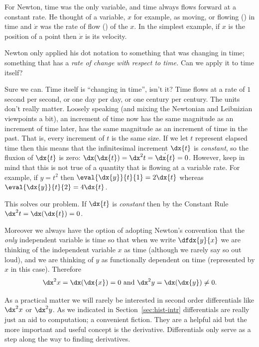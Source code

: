 \begin{Digression}
  For Newton, time was the only variable, and time always flows
  forward at a constant rate. He thought of a variable, $x$ for
  example, as moving, or flowing () in time and
  $\dot{x}$ was the rate of flow () of the
   $x$. In the simplest example, if $x$ is the
  position of a point then $\dot{x}$ is its velocity.

  Newton only applied his dot notation to something that was changing
  in time; something that has a \emph{rate of change with respect to
    time.} Can we apply it to time itself?

  Sure we can. Time itself is ``changing in time'', isn't it? Time
  flows at a rate of $1$ second per second, or one day per day, or one
  century per century. The units don't really matter. Loosely speaking
  (and mixing the Newtonian and Leibnizian viewpoints a bit), an
  increment of time now has the same magnitude as an increment of time
  later, has the same magnitude as an increment of time in the
  past. That is, every increment of $t$ is the same size.  If we let
  $t$ represent elapsed time then this means that the infinitesimal
  increment $\dx{t}$ is \emph{constant}, so the fluxion of $\dx{t}$ is
  zero: $\dx(\dx{t})=\dx^2{t}=\dot{\dx{t}}=0$.  However, keep in mind
  that this is not true of a quantity that is flowing at a variable
  rate. For example, if $y=t^2$ then $\eval{\dx{y}}{t}{1}=2\dx{t}$
  whereas $\eval{\dx{y}}{t}{2}=4\dx{t}$.

  This solves our problem. If $\dx{t}$ is \emph{constant} then by the
  Constant Rule $\dx^2{t}=\dx(\dx{t})=0$.

  Moreover we always have the option of adopting Newton's convention
  that the \emph{only} independent variable is time so that when we
  write $\dfdx{y}{x}$ we are thinking of the independent variable $x$
  as time (although we rarely say so out loud), and we are thinking of
  $y$ as functionally dependent on time (represented by $x$ in this
  case).  Therefore
  $$\dx^2x=\dx(\dx{x})=0 \text{ and } \dx^2y=\dx(\dx{y})\neq0.$$

  As a practical matter we will rarely be interested in second order
  differentials like $\dx^2x$ or $\dx^2y$. As we indicated in
  Section~\ref{sec:hist-intr} differentials are really just an aid to
  computation; a convenient fiction. They are a helpful aid but the
  more important and useful concept is the derivative.  Differentials
  only serve as a step along the way to finding derivatives.


\end{Digression}
